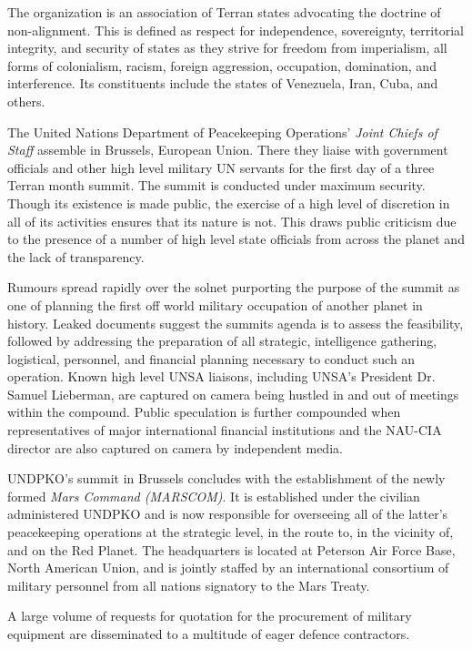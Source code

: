The organization is an association of Terran states advocating the doctrine of non-alignment. This is defined as respect for independence, sovereignty, territorial integrity, and security of states as they strive for freedom from imperialism, all forms of colonialism, racism, foreign aggression, occupation, domination, and interference. Its constituents include the states of Venezuela, Iran, Cuba, and others.
\StopTimelineDate

The United Nations Department of Peacekeeping Operations' {\it Joint Chiefs of Staff} assemble in Brussels, European Union. There they liaise with government officials and other high level military UN servants for the first day of a three Terran month summit. The summit is conducted under maximum security. Though its existence is made public, the exercise of a high level of discretion in all of its activities ensures that its nature is not. This draws public criticism due to the presence of a number of high level state officials from across the planet and the lack of transparency.

Rumours spread rapidly over the solnet purporting the purpose of the summit as one of planning the first off world military occupation of another planet in history. Leaked documents suggest the summits agenda is to assess the feasibility, followed by addressing the preparation of all strategic, intelligence gathering, logistical, personnel, and financial planning necessary to conduct such an operation. Known high level UNSA liaisons, including UNSA's President Dr. Samuel Lieberman, are captured on camera being hustled in and out of meetings within the compound. Public speculation is further compounded when representatives of major international financial institutions and the NAU-CIA director are also captured on camera by independent media.
\StopTimelineDate

UNDPKO's summit in Brussels concludes with the establishment of the newly formed {\it Mars Command (MARSCOM)}. It is established under the civilian administered UNDPKO and is now responsible for overseeing all of the latter's peacekeeping operations at the strategic level, in the route to, in the vicinity of, and on the Red Planet. The headquarters is located at Peterson Air Force Base, North American Union, and is jointly staffed by an international consortium of military personnel from all nations signatory to the Mars Treaty.

A large volume of requests for quotation for the procurement of military equipment are disseminated to a multitude of eager defence contractors.
\StopTimelineDate

